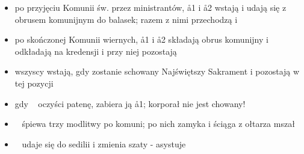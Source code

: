 \begin{itemize}
     \item po przyjęciu Komunii św. przez ministrantów, \aa1 i \aa2 wstają i udają się z obrusem komunijnym do balasek; razem z nimi przechodzą  i 
     \item po skończonej Komunii wiernych, \aa1 i \aa2 składają obrus komunijny i odkładają na kredensji i przy niej pozostają
     \item wszyscy wstają, gdy zostanie schowany Najświętszy Sakrament i pozostają w tej pozycji
     \item gdy \ii~ oczyści patenę, zabiera ją \aa1; korporał nie jest chowany!
     \item \ii~ śpiewa trzy modlitwy po komuni; po nich  zamyka i ściąga z ołtarza mszał
     \item \ii~ udaje się do sedilii i zmienia szaty - asystuje 
    \end{itemize}

